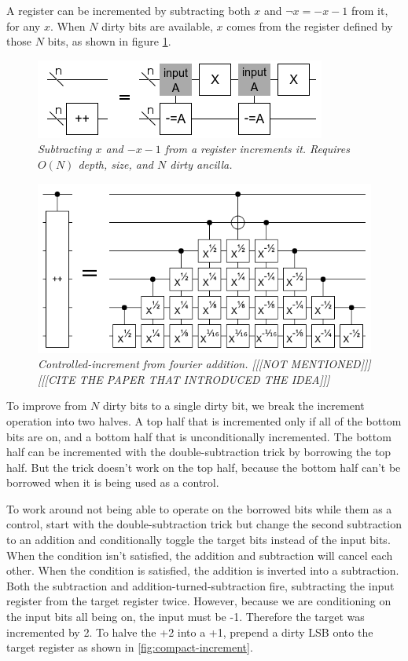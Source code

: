 \documentclass[twocolumn]{article}
\begin{document}
A register can be incremented by subtracting both $x$ and $\neg x = -x-1$ from it, for any $x$.
When $N$ dirty bits are available, $x$ comes from the register defined by those $N$ bits, as shown in figure \ref{fig:double-sub-increment}.

\begin{figure}
  \centering
  \includegraphics[totalheight=2cm]{double-sub-increment.png}
  \caption{\em Subtracting $x$ and $-x-1$ from a register increments it. Requires $O(N)$ depth, size, and $N$ dirty ancilla.}
  \label{fig:double-sub-increment}
\end{figure}

\begin{figure}
  \centering
  \includegraphics[totalheight=4cm]{fourier-addition.png}
  \caption{\em Controlled-increment from fourier addition. [[[NOT MENTIONED]]] [[[CITE THE PAPER THAT INTRODUCED THE IDEA]]]}
  \label{fig:fourier-addition}
\end{figure}

To improve from $N$ dirty bits to a single dirty bit, we break the increment operation into two halves.
A top half that is incremented only if all of the bottom bits are on, and a bottom half that is unconditionally incremented.
The bottom half can be incremented with the double-subtraction trick by borrowing the top half.
But the trick doesn't work on the top half, because the bottom half can't be borrowed when it is being used as a control.

To work around not being able to operate on the borrowed bits while them as a control, start with the double-subtraction trick but change the second subtraction to an addition and conditionally toggle the target bits instead of the input bits.
When the condition isn't satisfied, the addition and subtraction will cancel each other.
When the condition is satisfied, the addition is inverted into a subtraction.
Both the subtraction and addition-turned-subtraction fire, subtracting the input register from the target register twice.
However, because we are conditioning on the input bits all being on, the input must be -1.
Therefore the target was incremented by 2.
To halve the +2 into a +1, prepend a dirty LSB onto the target register as shown in \ref{fig:compact-increment}.
\end{document}
